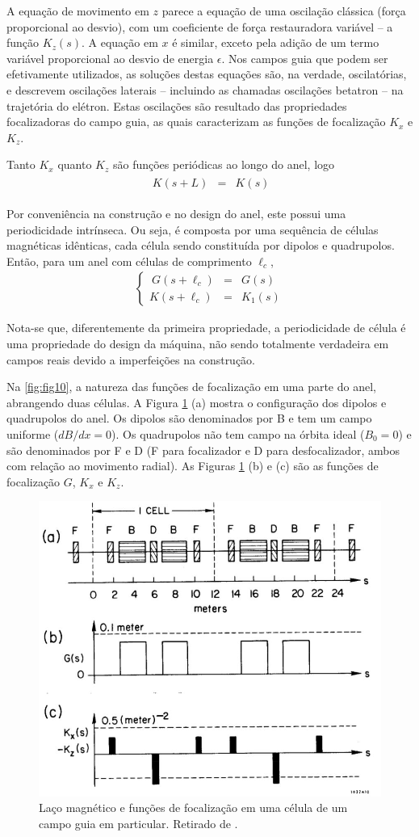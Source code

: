 A equação de movimento em $z$ parece a equação de uma oscilação clássica (força proporcional ao desvio), com um coeficiente de força restauradora variável -- a função $K_z(s)$. A equação em $x$ é similar, exceto pela adição de um termo variável proporcional ao desvio de energia $\epsilon$. Nos campos guia que podem ser efetivamente utilizados, as soluções destas equações são, na verdade, oscilatórias, e descrevem oscilações laterais -- incluindo as chamadas oscilações betatron -- na trajetória do elétron. Estas oscilações são resultado das propriedades focalizadoras do campo guia, as quais caracterizam as funções de focalização $K_x$ e $K_z$.

Tanto $K_x$ quanto $K_z$ são funções periódicas ao longo do anel, logo
\begin{align}
	\begin{array}{rcl}
	\ K(s+L) & = & K(s)
	\end{array}
\end{align}

Por conveniência na construção e no design do anel, este possui uma periodicidade intrínseca. Ou seja, é composta por uma sequência de células magnéticas idênticas, cada célula sendo constituída por dipolos e quadrupolos. Então, para um anel com células de comprimento $\ell_c$,
\begin{align}
	\left\{\begin{array}{rcl}
	\ G(s+\ell_c) & = & G(s)\\
	K(s+\ell_c) & = & K_1(s)
	\end{array}\right.
\end{align}

Nota-se que, diferentemente da primeira propriedade, a periodicidade de célula é uma propriedade do design da máquina, não sendo totalmente verdadeira em campos reais devido a imperfeições na construção.

Na \autoref{fig:fig10}, a natureza das funções de focalização em uma parte do anel, abrangendo duas células. A Figura \ref{fig:fig10} (a) mostra o configuração dos dipolos e quadrupolos do anel. Os dipolos são denominados por B e tem um campo uniforme ($dB/dx = 0$). Os quadrupolos não tem campo na órbita ideal ($B_0=0$) e são denominados por F e D (F para focalizador e D para desfocalizador, ambos com relação ao movimento radial). As Figuras \ref{fig:fig10} (b) e (c) são as funções de focalização $G$, $K_x$ e $K_z$.

\begin{figure}[!htb]
	\centering
	\includegraphics[width=0.7\linewidth]{./Figuras/fig10.jpeg}
	\caption{Laço magnético e funções de focalização em uma célula de um campo guia em particular. Retirado de \cite{sands1970physics}.}
	\label{fig:fig10}
\end{figure}